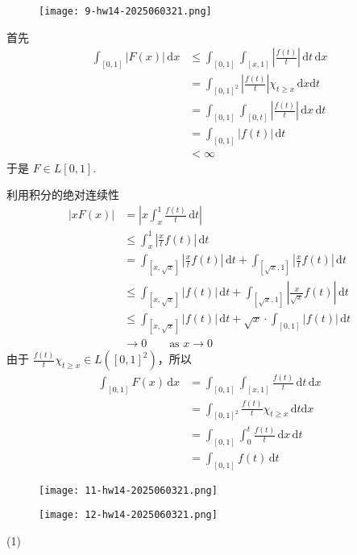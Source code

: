 \begin{exercise}
\begin{figure}[H]
\centering
\texttt{[image: 9-hw14-2025060321.png]}
\label{}
\end{figure}
\end{exercise}
首先
\[
\begin{aligned}
\int_{[0,1]}^{} \lvert F(x) \rvert  \, \mathrm{d}x  & \leq \int_{[0,1]}^{} \int_{[x,1]}^{} \left\lvert  \frac{f(t)}{t}  \right\rvert  \, \mathrm{d}t  \, \mathrm{d}x  \\
 & =\int_{[0,1]^2}^{} \left\lvert  \frac{f(t)}{t}  \right\rvert  \chi_{t\geq x}\, \mathrm{d}x \mathrm{d}t \\
 & =\int_{[0,1]}^{} \int_{[0,t]}^{} \left\lvert  \frac{f(t)}{t}  \right\rvert  \, \mathrm{d}x  \, \mathrm{d}t  \\
 & =\int_{[0,1]}^{ } \lvert f(t) \rvert  \, \mathrm{d}t \\
  & <\infty
\end{aligned}
\]
于是 $F\in L[0,1]$.

利用积分的绝对连续性
\[
\begin{aligned}
\lvert xF(x) \rvert  & =\left\lvert  x\int_{x}^{1} \frac{f(t)}{t} \, \mathrm{d}t  \right\rvert  \\
 & \leq \int_{x}^{1} \left\lvert  \frac{x}{t}f(t)   \right\rvert \, \mathrm{d}t   \\
 & =\int_{[x,\sqrt{ x }]}^{} \left\lvert  \frac{x}{t}f(t)  \right\rvert  \, \mathrm{d}t+\int_{[\sqrt{ x },1]}^{} \left\lvert  \frac{x}{t}f(t)  \right\rvert  \, \mathrm{d}t  \\
 & \leq \int_{[x,\sqrt{ x }]}^{} \lvert f(t) \rvert  \, \mathrm{d}t +\int_{[\sqrt{ x },1]}^{} \left\lvert  \frac{x}{\sqrt{ x }} f(t) \right\rvert  \, \mathrm{d}t \\
 & \leq  \int_{[x,\sqrt{ x }]}^{} \lvert f(t) \rvert  \, \mathrm{d}t +\sqrt{ x }\cdot\int_{[0,1]}^{} \lvert f(t) \rvert  \, \mathrm{d}t  \\
 & \to0\qquad \text{as }x\to0
\end{aligned}
\]
由于 $\frac{f (t)}{t}\chi_{t\geq x}\in L([0,1]^2)$，所以
\[
\begin{aligned}
\int_{[0,1]}^{} F(x) \, \mathrm{d}x  & =\int_{[0,1]}^{} \int_{[x,1]}^{} \frac{f(t)}{t} \, \mathrm{d}t  \, \mathrm{d}x  \\
 & =\int_{[0,1]^2}^{} \frac{f(t)}{t}\chi_{t\geq x} \, \mathrm{d}t\mathrm{d}x \\
  & =\int_{[0,1]}^{} \int_{0}^{t} \frac{f(t)}{t} \, \mathrm{d}x  \, \mathrm{d}t  \\
 & =\int_{[0,1]}^{} f(t) \, \mathrm{d}t 
\end{aligned} 
\]
\begin{exercise}
\begin{figure}[H]
\centering
\texttt{[image: 11-hw14-2025060321.png]}
\label{}
\end{figure}
\begin{figure}[H]
\centering
\texttt{[image: 12-hw14-2025060321.png]}
\label{}
\end{figure}
\end{exercise}
(1)

